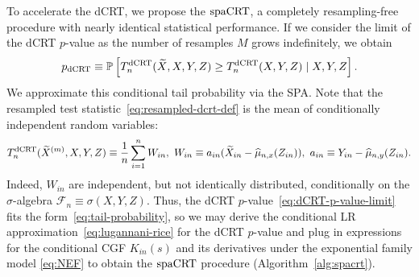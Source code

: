 \documentclass[12pt]{article}
\theoremstyle{definition}
\def\P{\mathbb{P}}
\def\P{\mathbb{P}}
\renewcommand{\P}{\mathbb{P}}							%
\newcommand{\srx}{X}									%
\newcommand{\srz}{Z}									%
\newcommand{\srxk}{\widetilde X}						%
\newcommand{\sry}{Y}									%
\newcommand{\dCRT}{\textnormal{dCRT}} 					%
\newcommand{\spacrt}{\textnormal{spaCRT}}               %
\begin{document}
  To accelerate the dCRT, we propose the $\spacrt$, a completely resampling-free procedure with nearly identical statistical performance. If we consider the limit of the dCRT $p$-value as the number of resamples $M$ grows indefinitely, we obtain
  \begin{align}\label{eq:dCRT-p-value-limit}
  p_{\dCRT} \equiv \P\left[T_n^{\dCRT}(\widetilde{X},X,Y,Z)\geq T_n^{\dCRT}(X,Y,Z) \mid X,Y,Z\right].
  \end{align}
  We approximate this conditional tail probability via the SPA. Note that the resampled test statistic~\eqref{eq:resampled-dcrt-def} is the mean of  conditionally independent random variables:
  \begin{align*}
	T_n^{\dCRT}(\srxk^{(m)}, \srx, \sry, \srz) \equiv \frac{1}{n}\sum_{i=1}^n W_{in},\ W_{in}\equiv a_{in}(\widetilde X_{in}-\widehat{\mu}_{n,x}(Z_{in})),\ a_{in}\equiv Y_{in}-\widehat\mu_{n,y}(Z_{in}).
  \end{align*}
  Indeed, $W_{in}$ are independent, but not identically distributed, conditionally on the $\sigma$-algebra $\mathcal{F}_n \equiv \sigma(\srx,\sry,\srz)$. Thus, the dCRT $p$-value~\eqref{eq:dCRT-p-value-limit} fits the form~\eqref{eq:tail-probability}, so we may derive the conditional LR approximation~\eqref{eq:lugannani-rice} for the dCRT $p$-value and plug in expressions for the conditional CGF $K_{in}(s)$ and its derivatives under the exponential family model \eqref{eq:NEF} to obtain the $\spacrt$ procedure (Algorithm~\ref{alg:spacrt}). 
\end{document}
